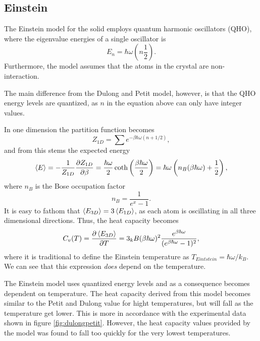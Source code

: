 \documentclass[11pt]{amsart}
\begin{document}
\subsection{Einstein}
The Einstein model for the solid employs quantum harmonic oscillators (QHO), where the eigenvalue energies of a single oscillator is
\begin{equation}
E_n = \hbar\omega\left(n\frac{1}{2}\right).
\end{equation}
Furthermore, the model assumes that the atoms in the crystal are non-interaction.

The main difference from the Dulong and Petit model, however, is that the QHO energy levels are quantized, as $n$ in the equation above can only have integer values. 

In one dimension the partition function becomes
\begin{equation}
Z_{1D} = \sum e^{-\beta\hbar\omega (n+1/2)},
\end{equation}
and from this stems the expected energy
\begin{equation}
\ev{E} = -\frac{1}{Z_{1D}}\frac{\partial Z_{1D}}{\partial \beta} = \frac{\hbar\omega}{2}\coth\left(\frac{\beta\hbar\omega}{2} \right) = \hbar\omega\left(n_B(\beta\hbar\omega) +\frac{1}{2} \right),
\end{equation}
where $n_B$ is the Bose occupation factor
\begin{equation*}
n_B = \frac{1}{e^x-1}.
\end{equation*}
It is easy to fathom that $\ev{E_{3D}} = 3\ev{E_{1D}}$, as each atom is oscillating in all three dimensional directions. Thus, the heat capacity becomes
\begin{equation}
C_v(T) = \frac{\partial \ev{E_{3D}}}{\partial T} = 3_kB(\beta\hbar\omega)^2\frac{e^{\beta\hbar\omega}}{(e^{\beta\hbar\omega} -1)^2},
\end{equation}
where it is traditional to define the Einstein temperature as $T_{Eintstein}=\hbar\omega / k_B$. We can see that this expression \emph{does} depend on the temperature.

The Einstein model uses quantized energy levels and as a consequence becomes dependent on temperature. The heat capacity derived from this model becomes similar to the Petit and Dulong value for hight temperatures, but will fall as the temperature get lower. This is more in accordance with the experimental data shown in figure \ref{fig:dulongpetit}. However, the heat capacity values provided by the model was found to fall too quickly for the very lowest temperatures.
\end{document}
